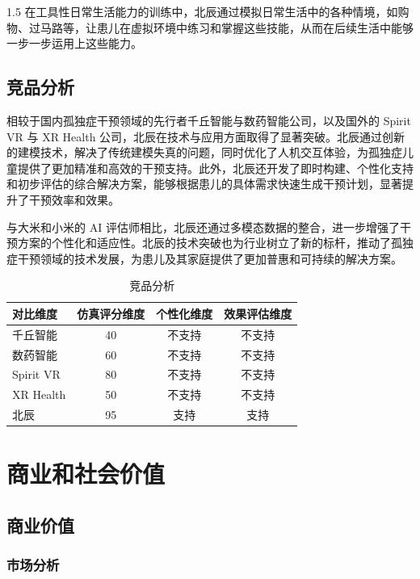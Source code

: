 \documentclass[zihao=-4]{ctexart}
\begin{document}
\begin{spacing}{1.5}
在工具性日常生活能力的训练中，北辰通过模拟日常生活中的各种情境，如购物、过马路等，让患儿在虚拟环境中练习和掌握这些技能，从而在后续生活中能够一步一步运用上这些能力。

\subsection{竞品分析}

相较于国内孤独症干预领域的先行者千丘智能与数药智能公司，以及国外的 Spirit VR 与 XR Health 公司，北辰在技术与应用方面取得了显著突破。北辰通过创新的建模技术，解决了传统建模失真的问题，同时优化了人机交互体验，为孤独症儿童提供了更加精准和高效的干预支持。此外，北辰还开发了即时构建、个性化支持和初步评估的综合解决方案，能够根据患儿的具体需求快速生成干预计划，显著提升了干预效率和效果。

与大米和小米的 AI 评估师相比，北辰还通过多模态数据的整合，进一步增强了干预方案的个性化和适应性。北辰的技术突破也为行业树立了新的标杆，推动了孤独症干预领域的技术发展，为患儿及其家庭提供了更加普惠和可持续的解决方案。

\begin{table}[H]
    \centering
    \caption{竞品分析}
    \begin{tabular}{lccc}
        \toprule
        对比维度 & 仿真评分维度 & 个性化维度 & 效果评估维度 \\
        \midrule
        千丘智能 & 40 & 不支持 & 不支持 \\
        数药智能 & 60 & 不支持 & 不支持 \\
        Spirit VR & 80 & 不支持 & 不支持 \\
        XR Health & 50 & 不支持 & 不支持 \\
        北辰 & 95 & 支持 & 支持 \\
        \bottomrule
    \end{tabular}
    \label{tab:beichen-competitors}
\end{table}

\section{商业和社会价值}

\subsection{商业价值}

\subsubsection{市场分析}


\end{spacing}
\end{document}
